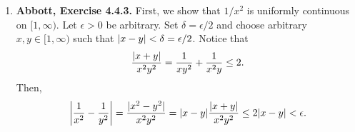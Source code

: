 \documentclass{article}
\DeclarePairedDelimiter\abs{\lvert}{\rvert}
\newcommand{\R}{\mathbf{R}}
\newcommand{\exc}[2][Abbott]{\item \textbf{#1, Exercise #2.}}
\newcommand{\lep}[1][L]{#1et $\epsilon > 0$ be arbitrary}
\let\oldsin\sin
\renewcommand{\sin}[1]{\oldsin \left( #1 \right)}
\begin{document}
\begin{enumerate}
\begin{enumerate}
    \item Yes. \lep. Set $\delta := \epsilon$ and choose arbitrary $x,y \in (0, 1)$ such that $\abs{x-y} < \epsilon$. Notice that
    \begin{equation*}
        \frac{1}{\sqrt{x^2+1} + \sqrt{y^2+1}} \leq 1/2
    \end{equation*} and $\abs{x+y} \leq 2$. It follows that 
    \begin{equation*}
        \frac{\abs{x+y}}{\sqrt{x^2+1} + \sqrt{y^2+1}} \leq 1.
    \end{equation*} Then, 
    \begin{align*}
        &\abs*{\sqrt{x^2+1}-\sqrt{y^2+1}} = 
        \abs*{\sqrt{x^2+1}-\sqrt{y^2+1}} \frac{\abs*{\sqrt{x^2+1}+\sqrt{y^2+1}}}{\abs*{\sqrt{x^2+1}+\sqrt{y^2+1}}} =\\
        &\frac{\abs{x^2-y^2}}{\abs*{\sqrt{x^2+1}+\sqrt{y^2+1}}} =
        \frac{\abs{x+y}}{\abs*{\sqrt{x^2+1}+\sqrt{y^2+1}}} \abs{x-y} \leq \abs{x-y} < \epsilon.
    \end{align*}
    
    \item Since $x, \sin{x}$ and $1/x$ are continuous on $\R \backslash 0$,  $x \sin{1/x}$ is continuous on $(0, 1]$. Also, we have shown in Example 4.3.6 that 
    \begin{equation*}
        g(x) = \begin{cases}
        x \sin{1/x} & x \neq 0 \\ 
        0 & x = 0
        \end{cases}
    \end{equation*} is continuous at $0$, so $g$ is continuous on $[0, 1]$. Since $[0, 1]$ is compact, $g$ is uniformly continuous on $[0, 1]$, which implies it is uniformly continuous on $(0, 1)$. But on this interval, $g(x) = x \sin{1/x}$, so $x \sin{1/x}$ is uniformly continuous on $(0, 1)$.
    \end{enumerate}
    
    \exc{4.4.3}
    First, we show that $1/x^2$ is uniformly continuous on $[1, \infty)$. \lep. Set $\delta = \epsilon/2$ and choose arbitrary $x, y \in [1, \infty)$ such that $\abs{x-y} < \delta = \epsilon/2$. Notice that 
    \begin{equation*}
        \frac{\abs*{x+y}}{x^2 y^2} = \frac{1}{x y^2} + \frac{1}{x^2 y} \leq 2.
    \end{equation*} Then, 
    \begin{equation*}
        \abs*{\frac{1}{x^2}-\frac{1}{y^2}} = \frac{\abs{x^2-y^2}}{x^2 y^2} =
        \abs{x-y} \frac{\abs*{x+y}}{x^2 y^2} \leq 2 \abs{x-y} < \epsilon.
    \end{equation*}
    

\end{enumerate}
\end{document}
